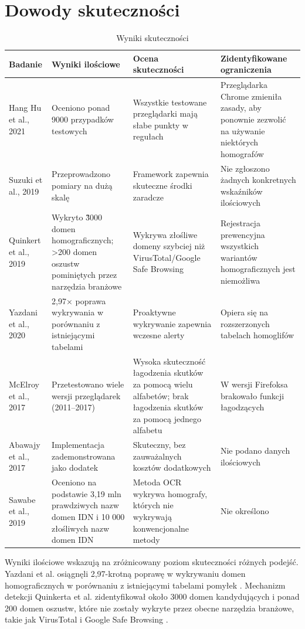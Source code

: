 \section{Dowody skuteczności} %
\begin{table}[!ht]
\centering
\caption{Wyniki skuteczności}
\label{tab:skutecznościTab}
{\footnotesize
\begin{tabularx}{\textwidth}{p{1.5cm}LLp{3cm}}
\toprule
\textbf{Badanie} & \textbf{Wyniki ilościowe} & \textbf{
Ocena skuteczności} & \textbf{Zidentyfikowane ograniczenia} \\ \midrule
Hang Hu et al., 2021  &  Oceniono ponad 9000 przypadków testowych  & Wszystkie testowane przeglądarki mają słabe punkty w regułach &Przeglądarka Chrome zmieniła zasady, aby ponownie zezwolić na używanie niektórych homografów \\ 
Suzuki et al., 2019  & Przeprowadzono pomiary na dużą skalę & Framework zapewnia skuteczne środki zaradcze & Nie zgłoszono żadnych konkretnych wskaźników ilościowych \\ 
Quinkert et al., 2019  & Wykryto \~3000 domen homograficznych; >200 domen oszustw pominiętych przez narzędzia branżowe & Wykrywa złośliwe domeny szybciej niż VirusTotal/Google Safe Browsing & Rejestracja prewencyjna wszystkich wariantów homograficznych jest niemożliwa \\ 
Yazdani et al., 2020  & 2,97× poprawa wykrywania w porównaniu z istniejącymi tabelami & Proaktywne wykrywanie zapewnia wczesne alerty & Opiera się na rozszerzonych tabelach homoglifów \\ 
McElroy et al., 2017 & Przetestowano wiele wersji przeglądarek (2011–2017) & Wysoka skuteczność łagodzenia skutków za pomocą wielu alfabetów; brak łagodzenia skutków za pomocą jednego alfabetu & W wersji Firefoksa brakowało funkcji łagodzących \\ 
Abawajy et al., 2017  & Implementacja zademonstrowana jako dodatek & Skuteczny, bez zauważalnych kosztów dodatkowych & Nie podano danych ilościowych \\
Sawabe et al., 2019  & Oceniono na podstawie 3,19 mln prawdziwych nazw domen IDN i 10 000 złośliwych nazw domen IDN & Metoda OCR wykrywa homografy, których nie wykrywają konwencjonalne metody & Nie określono \\ \bottomrule
\end{tabularx}
}

\end{table}

Wyniki ilościowe wskazują na zróżnicowany poziom skuteczności różnych podejść. Yazdani et al. osiągnęli 2,97-krotną poprawę w wykrywaniu domen homograficznych w porównaniu z istniejącymi tabelami pomyłek \cite{Yazdani2020}. Mechanizm detekcji Quinkerta et al. zidentyfikował około 3000 domen kandydujących i ponad 200 domen oszustw, które nie zostały wykryte przez obecne narzędzia branżowe, takie jak VirusTotal i Google Safe Browsing \cite{Quinkert}.

